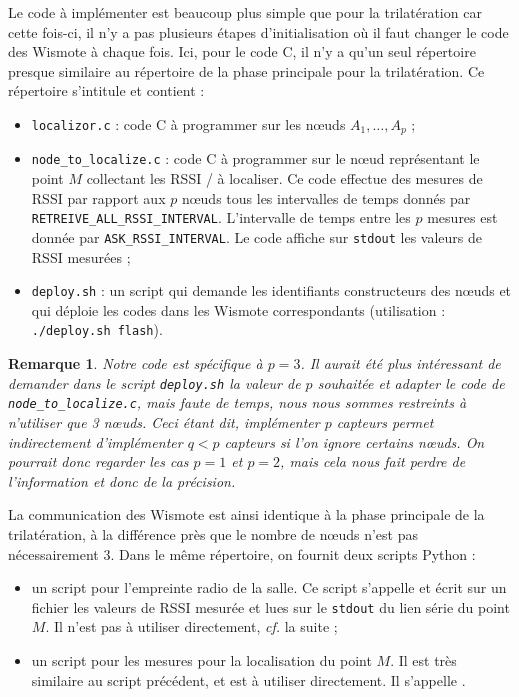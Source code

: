 \documentclass[french, a4paper, 12pt, parskip]{scrartcl}
\newtheorem*{remark}{Remarque}
\begin{document}
Le code à implémenter est beaucoup plus simple que pour la trilatération car
cette fois-ci, il n'y a pas plusieurs étapes d'initialisation où il faut
changer le code des Wismote à chaque fois. Ici, pour le code C, il n'y a qu'un
seul répertoire presque similaire au répertoire de la phase principale pour la
trilatération. Ce répertoire s'intitule  et
contient :
\begin{itemize}
  \item \verb+localizor.c+ : code C à programmer sur les nœuds $A_1,\dotsc,A_p$ ;
  \item \verb+node_to_localize.c+ : code C à programmer sur le nœud représentant
    le point $M$ collectant les RSSI / à localiser. Ce code effectue des mesures
    de RSSI par rapport aux $p$ nœuds tous les intervalles de temps donnés par
    \verb+RETREIVE_ALL_RSSI_INTERVAL+. L'intervalle de temps entre les $p$
    mesures est donnée par \verb+ASK_RSSI_INTERVAL+. Le code affiche sur
    \verb+stdout+ les valeurs de RSSI mesurées ;
  \item \verb+deploy.sh+ : un script qui demande les identifiants constructeurs
    des nœuds et qui déploie les codes dans les Wismote correspondants
    (utilisation : \verb+./deploy.sh flash+).
\end{itemize}

\begin{remark}
  Notre code est spécifique à $p=3$. Il aurait été plus intéressant de demander
  dans le script \verb+deploy.sh+ la valeur de $p$ souhaitée et adapter le code
  de \verb+node_to_localize.c+, mais faute de temps, nous nous sommes
  restreints à n'utiliser que 3 nœuds. Ceci étant dit, implémenter $p$ capteurs
  permet indirectement d'implémenter $q<p$ capteurs si l'on ignore certains
  nœuds. On pourrait donc regarder les cas $p=1$ et $p=2$, mais cela nous fait
  perdre de l'information et donc de la précision.
\end{remark}

La communication des Wismote est ainsi identique à la phase principale de la
trilatération, à la différence près que le nombre de nœuds n'est pas
nécessairement 3. Dans le même répertoire, on fournit deux scripts Python :
\begin{itemize}
  \item un script pour l'empreinte radio de la salle. Ce script s'appelle
     et écrit sur un fichier les valeurs de RSSI
    mesurée et lues sur le \verb+stdout+ du lien série du point $M$. Il n'est
    pas à utiliser directement, \textit{cf.} la suite ;
  \item un script pour les mesures pour la localisation du point $M$. Il est
    très similaire au script précédent, et est à utiliser directement. Il
    s'appelle .
\end{itemize}
\end{document}
